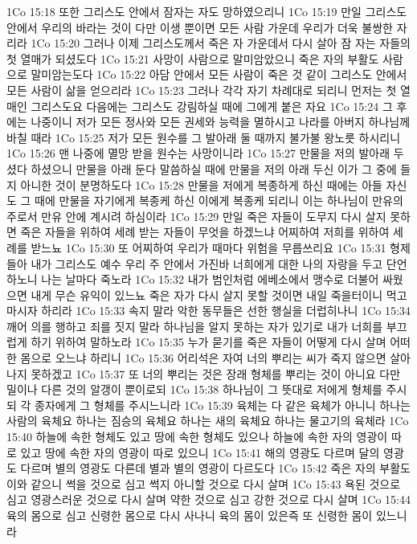 1Co 15:18  또한 그리스도 안에서 잠자는 자도 망하였으리니
1Co 15:19  만일 그리스도 안에서 우리의 바라는 것이 다만 이생 뿐이면 모든 사람 가운데 우리가 더욱 불쌍한 자리라
1Co 15:20  그러나 이제 그리스도께서 죽은 자 가운데서 다시 살아 잠 자는 자들의 첫 열매가 되셨도다
1Co 15:21  사망이 사람으로 말미암았으니 죽은 자의 부활도 사람으로 말미암는도다
1Co 15:22  아담 안에서 모든 사람이 죽은 것 같이 그리스도 안에서 모든 사람이 삶을 얻으리라
1Co 15:23  그러나 각각 자기 차례대로 되리니 먼저는 첫 열매인 그리스도요 다음에는 그리스도 강림하실 때에 그에게 붙은 자요
1Co 15:24  그 후에는 나중이니 저가 모든 정사와 모든 권세와 능력을 멸하시고 나라를 아버지 하나님께 바칠 때라
1Co 15:25  저가 모든 원수를 그 발아래 둘 때까지 불가불 왕노릇 하시리니
1Co 15:26  맨 나중에 멸망 받을 원수는 사망이니라
1Co 15:27  만물을 저의 발아래 두셨다 하셨으니 만물을 아래 둔다 말씀하실 때에 만물을 저의 아래 두신 이가 그 중에 들지 아니한 것이 분명하도다
1Co 15:28  만물을 저에게 복종하게 하신 때에는 아들 자신도 그 때에 만물을 자기에게 복종케 하신 이에게 복종케 되리니 이는 하나님이 만유의 주로서 만유 안에 계시려 하심이라
1Co 15:29  만일 죽은 자들이 도무지 다시 살지 못하면 죽은 자들을 위하여 세례 받는 자들이 무엇을 하겠느냐 어찌하여 저희를 위하여 세례를 받느뇨
1Co 15:30  또 어찌하여 우리가 때마다 위험을 무릅쓰리요
1Co 15:31  형제들아 내가 그리스도 예수 우리 주 안에서 가진바 너희에게 대한 나의 자랑을 두고 단언하노니 나는 날마다 죽노라
1Co 15:32  내가 범인처럼 에베소에서 맹수로 더불어 싸웠으면 내게 무슨 유익이 있느뇨 죽은 자가 다시 살지 못할 것이면 내일 죽을터이니 먹고 마시자 하리라
1Co 15:33  속지 말라 악한 동무들은 선한 행실을 더럽히나니
1Co 15:34  깨어 의를 행하고 죄를 짓지 말라 하나님을 알지 못하는 자가 있기로 내가 너희를 부끄럽게 하기 위하여 말하노라
1Co 15:35  누가 묻기를 죽은 자들이 어떻게 다시 살며 어떠한 몸으로 오느냐 하리니
1Co 15:36  어리석은 자여 너의 뿌리는 씨가 죽지 않으면 살아나지 못하겠고
1Co 15:37  또 너의 뿌리는 것은 장래 형체를 뿌리는 것이 아니요 다만 밀이나 다른 것의 알갱이 뿐이로되
1Co 15:38  하나님이 그 뜻대로 저에게 형체를 주시되 각 종자에게 그 형체를 주시느니라
1Co 15:39  육체는 다 같은 육체가 아니니 하나는 사람의 육체요 하나는 짐승의 육체요 하나는 새의 육체요 하나는 물고기의 육체라
1Co 15:40  하늘에 속한 형체도 있고 땅에 속한 형체도 있으나 하늘에 속한 자의 영광이 따로 있고 땅에 속한 자의 영광이 따로 있으니
1Co 15:41  해의 영광도 다르며 달의 영광도 다르며 별의 영광도 다른데 별과 별의 영광이 다르도다
1Co 15:42  죽은 자의 부활도 이와 같으니 썩을 것으로 심고 썩지 아니할 것으로 다시 살며
1Co 15:43  욕된 것으로 심고 영광스러운 것으로 다시 살며 약한 것으로 심고 강한 것으로 다시 살며
1Co 15:44  육의 몸으로 심고 신령한 몸으로 다시 사나니 육의 몸이 있은즉 또 신령한 몸이 있느니라
